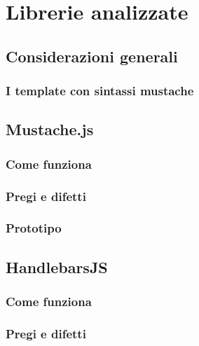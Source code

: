 
\chapter{Librerie analizzate}
\label{cap:librerie-analizzate}


\section{Considerazioni generali}


\subsection{I template con sintassi mustache}

\section{Mustache.js}

\subsection{Come funziona}

\subsection{Pregi e difetti}

\subsection{Prototipo}


\FloatBarrier
\section{HandlebarsJS}

\subsection{Come funziona}

\subsection{Pregi e difetti}

